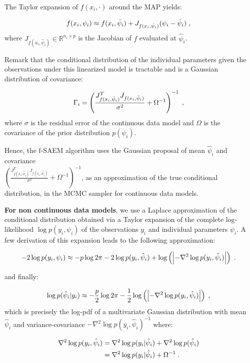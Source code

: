 The Taylor expansion of $f(x_{i},\cdot)$ around the MAP yields:

\begin{equation}
f(x_{i},\psi_i) \approx f(x_{i},\hat{\psi}_i) + J_{f(x_{i},\hat{\psi}_i)}(\psi_i - \hat{\psi}_i)\;,
\end{equation}
where $J_{f(x_{i},\hat{\psi}_i)} \in \mathbb{R}^{n_i \times p}$ is the Jacobian of $f$ evaluated at $\hat{\psi}_i$. 

Remark that the conditional distribution of the individual parameters given the observations under this linearized model is tractable and is a Gaussian distribution of covariance:


\begin{equation}
\Gamma_i =\left(\frac{ J_{f(x_{i},\hat{\psi}_i)}^T J_{f(x_{i},\hat{\psi}_i)} }{\sigma^2} + \Omega^{-1}\right)^{-1} \;,
\end{equation}
where $\sigma$ is the residual error of the continuous data model and $\Omega$ is the covariance of the prior distribution $p(\psi_i)$.

Hence, the f-SAEM algorithm uses the Gaussian proposal of mean $\hat{\psi}_i$ and covariance \\ $\left(\frac{ J_{f(x_{i},\hat{\psi}_i)}^T J_{f(x_{i},\hat{\psi}_i)} }{\sigma^2} + \Omega^{-1}\right)^{-1}$, as an approximation of the true conditional distribution, in the MCMC sampler for continuous data models.


\textbf{For non continuous data models}, we use a Laplace approximation of the conditional distribution obtained via a Taylor expansion of the complete log-likelihood $\log p(y_i,\psi_i)$ of the observations $y_i$ and individual parameters $\psi_i$.
A few derivation of this expansion leads to the following approximation:

$$
-2\log p(y_i,\psi_i)  \approx -p\log2\pi - 2\log p(y_i,\hat{\psi}_i) + \log \left(\left|-\nabla^2 \log p(y_i,\hat{\psi}_i)\right|\right)\;.
$$

and finally:

 $$
\log p(\hat{\psi}_i|y_i) \approx -\frac{p}{2}\log2\pi  -\frac{1}{2}\log \left(\left|-\nabla^2 \log p(y_i,\hat{\psi}_i) \right|\right)\;,
$$
which is precisely the log-pdf of a multivariate Gaussian distribution with mean $\hat{\psi}_i$ and  variance-covariance $-\nabla^2 \log p(y_i,\hat{\psi}_i)^{-1}$ where:

\begin{align}
\nabla^2 \log p(y_i,\hat{\psi}_i) &= \nabla^2 \log p(y_i|\hat{\psi}_i) + \nabla^2 \log p(\hat{\psi}_i) \\ \notag
&= \nabla^2 \log p(y_i|\hat{\psi}_i) + \Omega^{-1}\;.\notag
\end{align}

